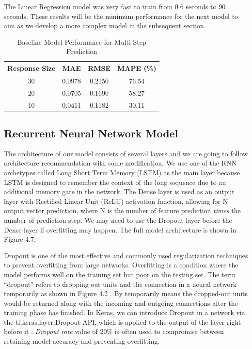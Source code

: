 The Linear Regression model was very fast to train from 0.6 seconds to 90 seconds. These results will be the minimum performance for the next model to aim as we develop a more complex model in the subsequent section.

\begin{table}[t!]
    \centering
    \caption{Baseline Model Performance for Multi Step Prediction}
    \label{tab:baseline2}
    \begin{tabular}{c|c|c|c}
      \textbf{Response Size} & \textbf{MAE} & \textbf{RMSE} & \textbf{MAPE (\%)} \\
      \hline
      30 & 0.0978 & 0.2150 & 76.54 \\
      20 & 0.0705 & 0.1690 & 58.27 \\
      10 & 0.0411 & 0.1182 & 30.11 \\
    \end{tabular}
\end{table}

\subsection{Recurrent Neural Network Model}
The architecture of our model consists of several layers and we are going to follow \cite{liraz2018ships} architecture recommendation with some modification. We use one of the RNN archetypes called Long Short Term Memory (LSTM) as the main layer because LSTM is designed to remember the context of the long sequence due to an additional memory gate in the network. The Dense layer is used as an output layer with Rectified Linear Unit (ReLU) activation function, allowing for N output vector prediction, where N is the number of feature prediction \emph{times} the number of prediction step. We may need to use the Dropout layer before the Dense layer if overfitting may happen. The full model architecture is shown in Figure 4.7.

Dropout is one of the most effective and commonly used regularization techniques to prevent overfitting from large networks. Overfitting is a condition where the model performs well on the training set but poor on the testing set. The term ``dropout" refers to dropping out units and the connection in a neural network temporarily as shown in Figure 4.2 \cite{srivastava2014dropout}. By temporarily means the dropped-out units would be returned along with the incoming and outgoing connections after the training phase has finished. In Keras, we can introduce Dropout in a network via the tf.keras.layer.Dropout API, which is applied to the output of the layer right before it \cite{franoischollet2017learning}. \emph{Dropout rate} value of 20\% is often used to compromise between retaining model accuracy and preventing overfitting.

